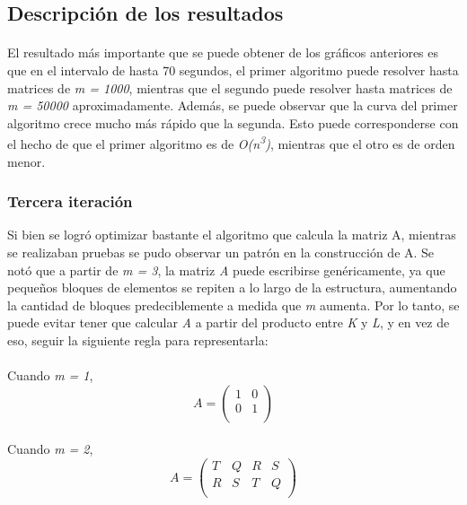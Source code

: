 \documentclass[a4paper,11pt]{article}
\begin{document}
\subsection{Descripci\'on de los resultados}
\paragraph{}
El resultado m\'as importante que se puede obtener de los gr\'aficos anteriores
es que en el intervalo de hasta 70 segundos, el primer algoritmo puede resolver
hasta matrices de \emph{m = 1000}, mientras que el segundo puede resolver hasta
matrices de \emph{m = 50000} aproximadamente.
Adem\'as, se puede observar que la curva del primer algoritmo crece mucho m\'as
r\'apido que la segunda. Esto puede corresponderse con el hecho de que el
primer algoritmo es de \emph{O(n\textsuperscript{3})}, mientras que el otro es
de orden menor.
\subsubsection{Tercera iteraci\'on}
Si bien se logr\'o optimizar bastante el algoritmo que calcula la matriz A,
mientras se realizaban pruebas se pudo observar un patr\'on en la
construcci\'on de A. Se not\'o que a partir de \emph{m = 3}, la matriz \emph{A}
puede escribirse gen\'ericamente, ya que pequeños bloques de elementos se
repiten a lo largo de la estructura, aumentando la cantidad de bloques
predeciblemente a medida que \emph{m} aumenta. Por lo tanto, se puede evitar tener
que calcular \emph{A} a partir del producto entre \emph{K} y \emph{L}, y en vez
de eso, seguir la siguiente regla para representarla:

\paragraph{}
Cuando \emph{m = 1},
\begin{equation} \label{matrizM1}
A =
\left( \begin{array}{cc}
1 & 0\\
0 & 1\\
\end{array} \right)
\end{equation}
\paragraph{}
Cuando \emph{m = 2},
\begin{equation} \label{matrizM2}
A =
\left( \begin{array}{cccc}
T & Q & R & S\\
R & S & T & Q\\
\end{array} \right)
\end{equation}
\end{document}
